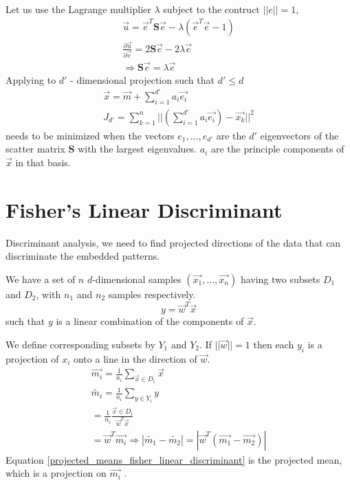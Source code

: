 \documentclass[11pt]{article}
\begin{document}
Let us use the Lagrange multiplier $\lambda$ subject to the contruct $||e||=1$, 
\begin{eqnarray}
\vec{u} = \vec{e}^T \mathbf{S} \vec{e} - \lambda ( \vec{e}^T\vec{e} - 1) \\
\frac{\partial \vec{u}} {\partial \vec{e}} = 2 \mathbf{S}\vec{e} - 2\lambda \vec{e} \\
\Rightarrow \mathbf{S}\vec{e} = \lambda \vec{e} 
\end{eqnarray}
Applying to $d'$ - dimensional projection such that $d' \le d$
\begin{eqnarray}
	\vec{x} = \vec{m} + \sum_{i=1}^{d'} a_i \vec{e_i} \\
	J_{d'} = \sum_{k=1}^n  || (\sum_{i=1}^{d'} a_i \vec{e_i}) - \vec{x_k} ||^2
\end{eqnarray}
needs to be minimized when the vectors $e_1 , ..., e_{d'}$ are the $d'$ eigenvectors of the scatter matrix $\mathbf{S}$ with the largest eigenvalues. $a_i$ are the principle components of $\vec{x}$ in that basis.  

\section{Fisher's Linear Discriminant}
Discriminant analysis, we need to find projected directions of the data that can discriminate the embedded patterns.  

We have a set of $n$ $d$-dimensional samples $(\vec{x_1},..., \vec{x_n})$ having two subsets $D_1$ and $D_2$, with $n_1$ and $n_2$ samples respectively.  
\begin{equation}
	y = \vec{w}^T \vec{x}
\end{equation}
such that $y$ is a linear combination of the components of $\vec{x}$.

We define corresponding subsets by $Y_1$ and $Y_2$.  If $||\vec{w}||=1$ then each $y_i$ is a projection of $x_i$ onto a line in the direction of $\vec{w}$.
\begin{eqnarray}
	\vec{m_i} = \frac{1}{n_i} \sum_{\vec{x} \in D_i} \vec{x} \\
	\tilde{m_i} = \frac{1}{n_i} \sum_{y \in Y_i} y \\ 
	= \frac{1}{n_i} \frac{\vec{x} \in D_i} {\vec{w}^T \vec{x}} \\
	= \vec{w}^T \vec{m_i}
	\Rightarrow |\tilde{m_1} - \tilde{m_2}|  = | \vec{w}^T (\vec{m_1} - \vec{m_2}) | \label{projected_means_fisher_linear_discriminant} 
\end{eqnarray}
Equation \ref{projected_means_fisher_linear_discriminant} is the projected mean, which is a projection on ${\vec{m_i}}$ \cite[118]{duda-hart-stork}.  
\end{document}
